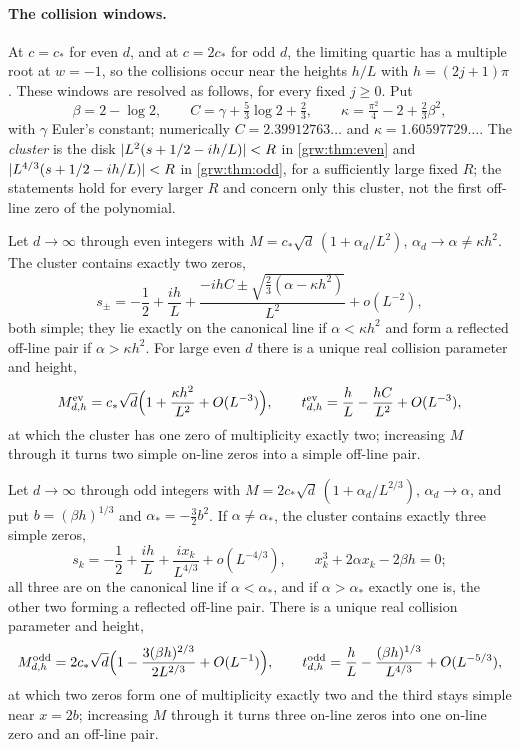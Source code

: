 \paragraph{The collision windows.}
At $c=c_*$ for even $d$, and at $c=2c_*$ for odd $d$, the limiting quartic
has a multiple root at $w=-1$, so the collisions occur near the heights
$h/L$ with $h=(2j+1)\pi$. These windows are resolved as follows, for every
fixed $j\ge0$. Put
\[
 \beta=2-\log2,\qquad C=\gamma+\tfrac53\log2+\tfrac23,\qquad
 \kappa=\tfrac{\pi^2}4-2+\tfrac23\beta^2,
\]
with $\gamma$ Euler's constant; numerically $C=2.39912763\ldots$ and
$\kappa=1.60597729\ldots$. The \emph{cluster} is the disk
$\lvert L^2(s+1/2-ih/L)\rvert<R$ in \cref{grw:thm:even} and
$\lvert L^{4/3}(s+1/2-ih/L)\rvert<R$ in \cref{grw:thm:odd}, for a sufficiently large
fixed $R$; the statements hold for every larger $R$ and concern only this
cluster, not the first off-line zero of the polynomial.

\begin{theorem}\label{grw:thm:even}
Let $d\to\infty$ through even integers with
$M=c_*\sqrt d\,(1+\alpha_d/L^2)$, $\alpha_d\to\alpha\ne\kappa h^2$. The
cluster contains exactly two zeros,
\[
 s_\pm=-\frac12+\frac{ih}L+\frac{-ihC\pm\sqrt{\frac23(\alpha-\kappa h^2)}}{L^2}+o(L^{-2}),
\]
both simple; they lie exactly on the canonical line if $\alpha<\kappa h^2$
and form a reflected off-line pair if $\alpha>\kappa h^2$. For large even
$d$ there is a unique real collision parameter and height,
\[
 M^{\mathrm{ev}}_{d,h}=c_*\sqrt d\Bigl(1+\frac{\kappa h^2}{L^2}+O(L^{-3})\Bigr),\qquad
 t^{\mathrm{ev}}_{d,h}=\frac hL-\frac{hC}{L^2}+O(L^{-3}),
\]
at which the cluster has one zero of multiplicity exactly two; increasing $M$
through it turns two simple on-line zeros into a simple off-line pair.
\end{theorem}

\begin{theorem}\label{grw:thm:odd}
Let $d\to\infty$ through odd integers with
$M=2c_*\sqrt d\,(1+\alpha_d/L^{2/3})$, $\alpha_d\to\alpha$, and put
$b=(\beta h)^{1/3}$ and $\alpha_*=-\frac32b^2$. If $\alpha\ne\alpha_*$, the
cluster contains exactly three simple zeros,
\[
 s_k=-\frac12+\frac{ih}L+\frac{ix_k}{L^{4/3}}+o(L^{-4/3}),\qquad
 x_k^3+2\alpha x_k-2\beta h=0 ;
\]
all three are on the canonical line if $\alpha<\alpha_*$, and if
$\alpha>\alpha_*$ exactly one is, the other two forming a reflected off-line
pair. There is a unique real collision parameter and height,
\[
 M^{\mathrm{odd}}_{d,h}=2c_*\sqrt d\Bigl(1-\frac{3(\beta h)^{2/3}}{2L^{2/3}}+O(L^{-1})\Bigr),\qquad
 t^{\mathrm{odd}}_{d,h}=\frac hL-\frac{(\beta h)^{1/3}}{L^{4/3}}+O(L^{-5/3}),
\]
at which two zeros form one of multiplicity exactly two and the third stays
simple near $x=2b$; increasing $M$ through it turns three on-line zeros into
one on-line zero and an off-line pair.
\end{theorem}

